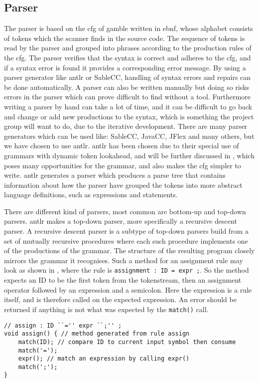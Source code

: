 \subsection*{Parser}\label{subsec:parser}
The parser is based on the \acrfull{cfg} of \gls{gamble} written in \acrfull{ebnf}, whose alphabet consists of tokens which the scanner finds in the source code.
The sequence of tokens is read by the parser and grouped into phrases according to the production rules of the \acrshort{cfg}.
The parser verifies that the syntax is correct and adheres to the \acrshort{cfg}, and if a syntax error is found it provides a corresponding error message. \citep{Crafting_book}
By using a parser generator like \acrshort{antlr} or SableCC, handling of syntax errors and repairs can be done automatically.
A parser can also be written manually but doing so risks errors in the parser which can prove difficult to find without a tool.
Furthermore writing a parser by hand can take a lot of time, and it can be difficult to go back and change or add new productions to the syntax, which is something the project group will want to do, due to the iterative development.
There are many parser generators which can be used like: SableCC, JavaCC, JFlex and many others, but we have chosen to use \acrshort{antlr}.
\acrshort{antlr} has been chosen due to their special use of grammars with dynamic token lookahead, and will be further discussed in , which poses many opportunities for the grammar, and also makes the \acrshort{cfg} simpler to write.
\acrshort{antlr} generates a parser which produces a parse tree that contains information about how the parser have grouped the tokens into more abstract language definitions, such as expressions and statements. 

There are different kind of parsers, most common are bottom-up and top-down parsers.
\acrshort{antlr} makes a top-down parser, more specifically a recursive descent parser.
A recursive descent parser is a subtype of top-down parsers build from a set of mutually recursive procedures where each such procedure implements one of the productions of the grammar.
The structure of the resulting program closely mirrors the grammar it recognises. \citep{Recursive_programming}
Such a method for an assignment rule may look as shown in , where the rule is \texttt{assignment : ID = expr ;}.
So the method expects an ID to be the first token from the tokenstream, then an assignment operator followed by an expression and a semicolon.
Here the expression is a rule itself, and is therefore called on the expected expression.
An error should be returned if anything is not what was expected by the \texttt{match()} call.
\begin{lstlisting}[caption=Example a recursive descent parser method,frame=tlrb,label={lst:rdpmethod}]
// assign : ID ``='' expr ``;'' ;
void assign() { // method generated from rule assign
    match(ID); // compare ID to current input symbol then consume
    match('=');
    expr(); // match an expression by calling expr()
    match(';');
}
\end{lstlisting}
